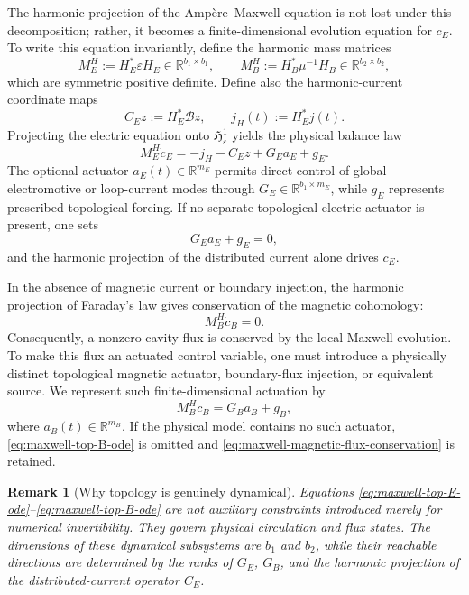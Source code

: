 \documentclass{article}
\newtheorem{remark}{Remark}[section]
\newcommand{\R} {\mathbb R}
\newcommand{\HH}{\mathfrak H}
\begin{document}
The harmonic projection of the Amp\`ere--Maxwell equation is not lost
under this decomposition; rather, it becomes a finite-dimensional
evolution equation for $c_E$. To write this equation invariantly,
define the harmonic mass matrices
\begin{equation}
  M_E^H:=H_E^*\varepsilon H_E\in\R^{b_1\times b_1},
  \qquad
  M_B^H:=H_B^*\mu^{-1}H_B\in\R^{b_2\times b_2},
\end{equation}
which are symmetric positive definite. Define also the harmonic-current
coordinate maps
\begin{equation}
  C_Ez:=H_E^*\mathcal Bz,
  \qquad
  j_H(t):=H_E^*j(t).
\end{equation}
Projecting the electric equation onto $\HH^1_{\varepsilon}$ yields the
physical balance law
\begin{equation}
  M_E^H\dot c_E
  =
  -j_H-C_Ez+G_Ea_E+g_E.
  \label{eq:maxwell-top-E-ode}
\end{equation}
The optional actuator $a_E(t)\in\R^{m_E}$ permits direct control of
global electromotive or loop-current modes through
$G_E\in\R^{b_1\times m_E}$, while $g_E$ represents prescribed
topological forcing. If no separate topological electric actuator is
present, one sets
\[
  G_Ea_E+g_E=0,
\]
and the harmonic projection of the distributed current alone drives
$c_E$.

In the absence of magnetic current or boundary injection, the harmonic
projection of Faraday's law gives conservation of the magnetic
cohomology:
\begin{equation}
  M_B^H\dot c_B=0.
  \label{eq:maxwell-magnetic-flux-conservation}
\end{equation}
Consequently, a nonzero cavity flux is conserved by the local Maxwell
evolution. To make this flux an actuated control variable, one must
introduce a physically distinct topological magnetic actuator,
boundary-flux injection, or equivalent source. We represent such
finite-dimensional actuation by
\begin{equation}
  M_B^H\dot c_B=G_Ba_B+g_B,
  \label{eq:maxwell-top-B-ode}
\end{equation}
where $a_B(t)\in\R^{m_B}$. If the physical model contains no such
actuator, \eqref{eq:maxwell-top-B-ode} is omitted and
\eqref{eq:maxwell-magnetic-flux-conservation} is retained.

\begin{remark}[Why topology is genuinely dynamical]
Equations
\eqref{eq:maxwell-top-E-ode}--\eqref{eq:maxwell-top-B-ode}
are not auxiliary constraints introduced merely for numerical
invertibility. They govern physical circulation and flux states. The
dimensions of these dynamical subsystems are $b_1$ and $b_2$, while
their reachable directions are determined by the ranks of $G_E$,
$G_B$, and the harmonic projection of the distributed-current operator
$C_E$.
\end{remark}
\end{document}
